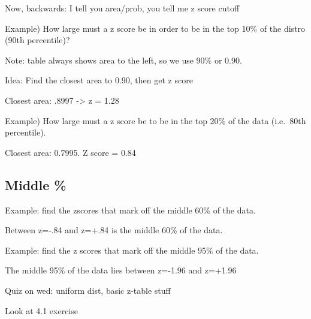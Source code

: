 \documentclass[]{article}
\begin{document}
Now, backwards: I tell you area/prob, you tell me z score cutoff

Example) How large must a z score be in order to be in the top 10\% of
the distro (90th percentile)?

Note: table always shows area to the left, so we use 90\% or 0.90.

Idea: Find the closest area to 0.90, then get z score

Closest area: .8997 -\textgreater{} z = 1.28

Example) How large must a z score be to be in the top 20\% of the data
(i.e.~80th percentile).

Closest area: 0.7995. Z score = 0.84

\hypertarget{middle}{%
\subsection{Middle \%}\label{middle}}

Example: find the zscores that mark off the middle 60\% of the data.

Between z=-.84 and z=+.84 is the middle 60\% of the data.

Example: find the z scores that mark off the middle 95\% of the data.

The middle 95\% of the data lies between z=-1.96 and z=+1.96

Quiz on wed: uniform dist, basic z-table stuff

Look at 4.1 exercise
\end{document}
